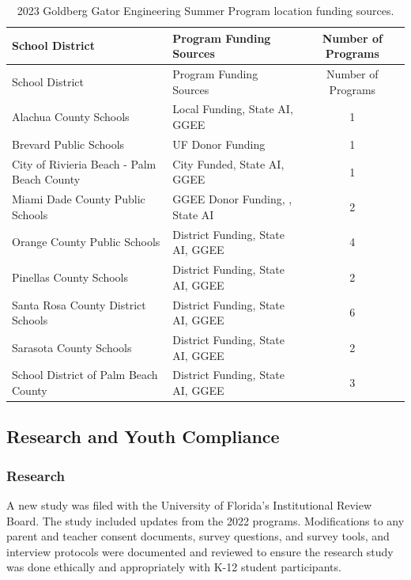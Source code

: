 \documentclass[
]{article}
\begin{document}
\begin{longtable}[]{@{}llc@{}}
\caption{2023 Goldberg Gator Engineering Summer Program location funding
sources.}\tabularnewline
\toprule\noalign{}
School District & Program Funding Sources & Number of Programs \\
\midrule\noalign{}
\endfirsthead
\toprule\noalign{}
School District & Program Funding Sources & Number of Programs \\
\midrule\noalign{}
\endhead
\bottomrule\noalign{}
\endlastfoot
Alachua County Schools & Local Funding, State AI, GGEE & 1 \\
Brevard Public Schools & UF Donor Funding & 1 \\
City of Rivieria Beach - Palm Beach County & City Funded, State AI, GGEE
& 1 \\
Miami Dade County Public Schools & GGEE Donor Funding, , State AI & 2 \\
Orange County Public Schools & District Funding, State AI, GGEE & 4 \\
Pinellas County Schools & District Funding, State AI, GGEE & 2 \\
Santa Rosa County District Schools & District Funding, State AI, GGEE &
6 \\
Sarasota County Schools & District Funding, State AI, GGEE & 2 \\
School District of Palm Beach County & District Funding, State AI, GGEE
& 3 \\
\end{longtable}

\hypertarget{research-and-youth-compliance}{%
\subsection{Research and Youth
Compliance}\label{research-and-youth-compliance}}

\hypertarget{research}{%
\subsubsection{Research}\label{research}}

A new study was filed with the University of Florida's Institutional
Review Board. The study included updates from the 2022 programs.
Modifications to any parent and teacher consent documents, survey
questions, and survey tools, and interview protocols were documented and
reviewed to ensure the research study was done ethically and
appropriately with K-12 student participants.
\end{document}
